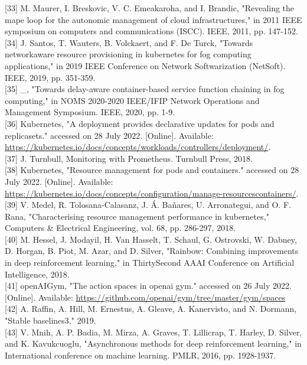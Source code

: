 \documentclass[10pt]{article}
\begin{document}
[33] M. Maurer, I. Breskovic, V. C. Emeakaroha, and I. Brandic, "Revealing the mape loop for the autonomic management of cloud infrastructures," in 2011 IEEE symposium on computers and communications (ISCC). IEEE, 2011, pp. 147-152.\\[0pt]
[34] J. Santos, T. Wauters, B. Volckaert, and F. De Turck, "Towards networkaware resource provisioning in kubernetes for fog computing applications," in 2019 IEEE Conference on Network Softwarization (NetSoft). IEEE, 2019, pp. 351-359.\\[0pt]
[35] \_, "Towards delay-aware container-based service function chaining in fog computing," in NOMS 2020-2020 IEEE/IFIP Network Operations and Management Symposium. IEEE, 2020, pp. 1-9.\\[0pt]
[36] Kubernetes, "A deployment provides declarative updates for pods and replicasets." accessed on 28 July 2022. [Online]. Available: \href{https://kubernetes.io/docs/concepts/workloads/controllers/deployment/}{https://kubernetes.io/docs/concepts/workloads/controllers/deployment/}.\\[0pt]
[37] J. Turnbull, Monitoring with Prometheus. Turnbull Press, 2018.\\[0pt]
[38] Kubernetes, "Resource management for pods and containers." accessed on 28 July 2022. [Online]. Available: \href{https://kubernetes.io/docs/concepts/configuration/manage-resourcescontainers/}{https://kubernetes.io/docs/concepts/configuration/manage-resourcescontainers/}.\\[0pt]
[39] V. Medel, R. Tolosana-Calasanz, J. Á. Bañares, U. Arronategui, and O. F. Rana, "Characterising resource management performance in kubernetes," Computers \& Electrical Engineering, vol. 68, pp. 286-297, 2018.\\[0pt]
[40] M. Hessel, J. Modayil, H. Van Hasselt, T. Schaul, G. Ostrovski, W. Dabney, D. Horgan, B. Piot, M. Azar, and D. Silver, "Rainbow: Combining improvements in deep reinforcement learning," in ThirtySecond AAAI Conference on Artificial Intelligence, 2018.\\[0pt]
[41] openAIGym, "The action spaces in openai gym." accessed on 26 July 2022. [Online]. Available: \href{https://github.com/openai/gym/tree/master/gym/spaces}{https://github.com/openai/gym/tree/master/gym/spaces}\\[0pt]
[42] A. Raffin, A. Hill, M. Ernestus, A. Gleave, A. Kanervisto, and N. Dormann, "Stable baselines3," 2019.\\[0pt]
[43] V. Mnih, A. P. Badia, M. Mirza, A. Graves, T. Lillicrap, T. Harley, D. Silver, and K. Kavukcuoglu, "Asynchronous methods for deep reinforcement learning," in International conference on machine learning. PMLR, 2016, pp. 1928-1937.\\[0pt]
\end{document}
